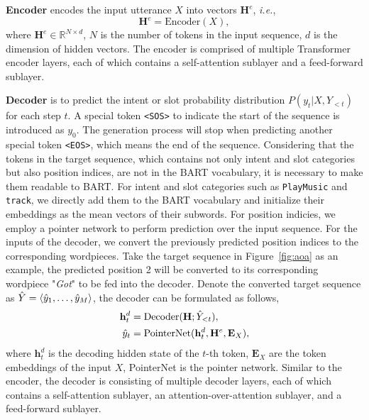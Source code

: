 \documentclass[11pt]{article}
\begin{document}
\textbf{Encoder} encodes the input utterance $X$ into vectors $\mathbf{H}^e$, \textit{i.e.},
\begin{equation}
\mathbf{H}^e = \text{Encoder}(X),
\end{equation}
where $\mathbf{H}^e\in \mathbb{R}^{N\times d}$, $N$ is the number of tokens in the input sequence, $d$ is the dimension of hidden vectors. The encoder is comprised of multiple Transformer encoder layers, each of which contains a self-attention sublayer and a feed-forward sublayer.

\textbf{Decoder} is to predict the intent or slot probability distribution $P(y_t|X, Y_{<t})$ for each step $t$. A special token \texttt{<SOS>} to indicate the start of the sequence is introduced as $y_0$. The generation process will stop when predicting another special token \texttt{<EOS>}, which means the end of the sequence. Considering that the tokens in the target sequence, which contains not only intent and slot categories but also position indices, are not in the BART vocabulary, it is necessary to make them readable to BART. For intent and slot categories such as \texttt{PlayMusic} and \texttt{track}, we directly add them to the BART vocabulary and initialize their embeddings as the mean vectors of their subwords. For position indicies, we employ a pointer network\cite{DBLP:conf/nips/VinyalsFJ15} to perform prediction over the input sequence. For the inputs of the decoder, we convert the previously predicted position indices to the corresponding wordpieces. Take the target sequence in Figure~\ref{fig:aoa} as an example, the predicted position 2 will be converted to its corresponding wordpiece "\textit{Got}" to be fed into the decoder. Denote the converted target sequence as $\Hat{Y}=\langle \hat{y}_1, \dots, \hat{y}_M\rangle$, the decoder can be formulated as follows,
\begin{align}
    \mathbf{h}^{d}_{t} &= \text{Decoder}(\mathbf{H}; \Hat{Y}_{<t}),\\
    \hat{y}_{t} &= \text{PointerNet}(\mathbf{h}^d_{t}, \mathbf{H}^e, \mathbf{E}_X),
\end{align}
where $\mathbf{h}^d_t$ is the decoding hidden state of the $t$-th token, $\mathbf{E}_X$ are the token embeddings of the input $X$, PointerNet is the pointer network. Similar to the encoder, the decoder is consisting of multiple decoder layers, each of which contains a self-attention sublayer, an attention-over-attention sublayer, and a feed-forward sublayer.
\end{document}
